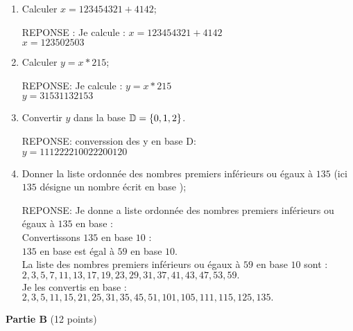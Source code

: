 \begin{enumerate}[1. ]
\item{}Calculer $ x= 123454321+4142$;
\begin{framed}
REPONSE :
Je calcule :
$ x= 123454321+4142$ \\
$ x= 123502503$
\end{framed}
\item{}Calculer $ y= x * 215$;
\begin{framed}
REPONSE:
Je calcule :
$ y= x * 215$  \\
$ y= 31531132153$
\end{framed}
\item{}Convertir $ y $ dans la  base $\mathbb{D}=\{0,1,2\}$.
\begin{framed}
REPONSE:
converssion des y en base D: \\
$y = 111222210022200120$
\end{framed}
\item{}Donner la liste ordonnée des  nombres premiers inférieurs ou égaux \`a  $135$ (ici $135$ désigne un nombre écrit en base \B);
\begin{framed}
REPONSE:
Je donne a liste ordonnée des nombres premiers inférieurs ou égaux à $135$ en base \B : \\
Convertissons $135$ en base $10$ : \\
$135$ en base \B est égal à $59$ en base $10$. \\
La liste des nombres premiers inférieurs ou égaux à $59$ en base $10$ sont : \\
$2,3,5,7,11,13,17,19,23,29,31,37,41,43,47,53,59.$ \\
Je les convertis en base \B : \\
$2,3,5,11,15,21,25,31,35,45,51,101,105,111,115,125,135.$

\end{framed}

\end{enumerate}






\newpage
\textbf{Partie B} (12 points)\\

